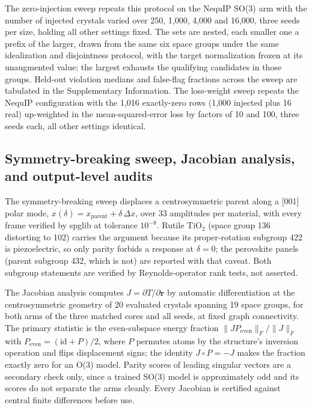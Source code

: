 The zero-injection sweep repeats this protocol on the NequIP SO(3) arm with the number of injected crystals varied over 250, 1,000, 4,000 and 16,000, three seeds per size, holding all other settings fixed. The sets are nested, each smaller one a prefix of the larger, drawn from the same six space groups under the same idealization and disjointness protocol, with the target normalization frozen at its unaugmented value; the largest exhausts the qualifying candidates in those groups. Held-out violation medians and false-flag fractions across the sweep are tabulated in the Supplementary Information. The loss-weight sweep repeats the NequIP configuration with the 1,016 exactly-zero rows (1,000 injected plus 16 real) up-weighted in the mean-squared-error loss by factors of 10 and 100, three seeds each, all other settings identical.

\subsection*{Symmetry-breaking sweep, Jacobian analysis, and output-level audits}

The symmetry-breaking sweep displaces a centrosymmetric parent along a [001] polar mode, $x(\delta) = x_{\mathrm{parent}} + \delta\,\Delta x$, over 33 amplitudes per material, with every frame verified by spglib at tolerance $10^{-8}$. Rutile TiO$_2$ (space group 136 distorting to 102) carries the argument because its proper-rotation subgroup 422 is piezoelectric, so only parity forbids a response at $\delta=0$; the perovskite panels (parent subgroup 432, which is not) are reported with that caveat. Both subgroup statements are verified by Reynolds-operator rank tests, not asserted.

The Jacobian analysis computes $J = \partial T/\partial \mathbf{r}$ by automatic differentiation at the centrosymmetric geometry of 20 evaluated crystals spanning 19 space groups, for both arms of the three matched cores and all seeds, at fixed graph connectivity. The primary statistic is the even-subspace energy fraction $\lVert J P_{\mathrm{even}}\rVert_F / \lVert J \rVert_F$ with $P_{\mathrm{even}} = (\mathrm{id} + P)/2$, where $P$ permutes atoms by the structure's inversion operation and flips displacement signs; the identity $J \circ P = -J$ makes the fraction exactly zero for an O(3) model. Parity scores of leading singular vectors are a secondary check only, since a trained SO(3) model is approximately odd and its scores do not separate the arms cleanly. Every Jacobian is certified against central finite differences before use.

